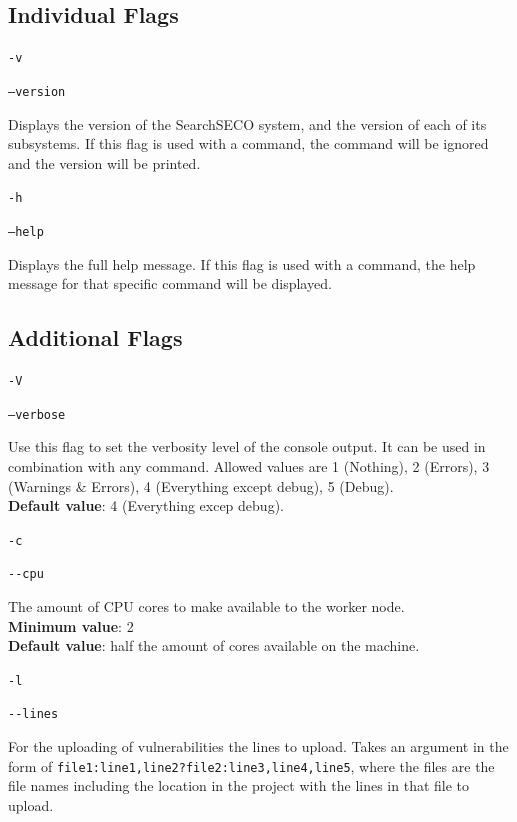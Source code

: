 \documentclass{article}
\begin{document}
\subsection{Individual Flags}
\texttt{-v}\par
\texttt{--version}\par
\begin{adjustwidth}{1cm}{}
Displays the version of the SearchSECO system, and the version of each of its subsystems. If this flag is used with a command, the command will be ignored and the version will be printed.
\end{adjustwidth}

\texttt{-h}\par
\texttt{--help}\par
\begin{adjustwidth}{1cm}{}
Displays the full help message. If this flag is used with a command, the help message for that specific command will be displayed.
\end{adjustwidth}

\subsection{Additional Flags}
\texttt{-V}\par
\texttt{--verbose}\par
\begin{adjustwidth}{1cm}{}
Use this flag to set the verbosity level of the console output. It can be used in combination with any command. Allowed values are 1 (Nothing), 2 (Errors), 3 (Warnings \& Errors), 4 (Everything except debug), 5 (Debug).\\
\textbf{Default value}: 4 (Everything excep debug). 
\end{adjustwidth}

\texttt{-c}\par
\texttt{-{}-cpu}\par
\begin{adjustwidth}{1cm}{}
The amount of CPU cores to make available to the worker node. \\
\textbf{Minimum value}: 2 \\
\textbf{Default value}: half the amount of cores available on the machine. 
\end{adjustwidth}

\texttt{-l}\par
\texttt{-{}-lines}\par
\begin{adjustwidth}{1cm}{}
For the uploading of vulnerabilities the lines to upload. Takes an argument in the form of \texttt{file1:line1,line2?file2:line3,line4,line5}, where the files are the file names including the location in the project with the lines in that file to upload. \\
\end{adjustwidth}
\end{document}

